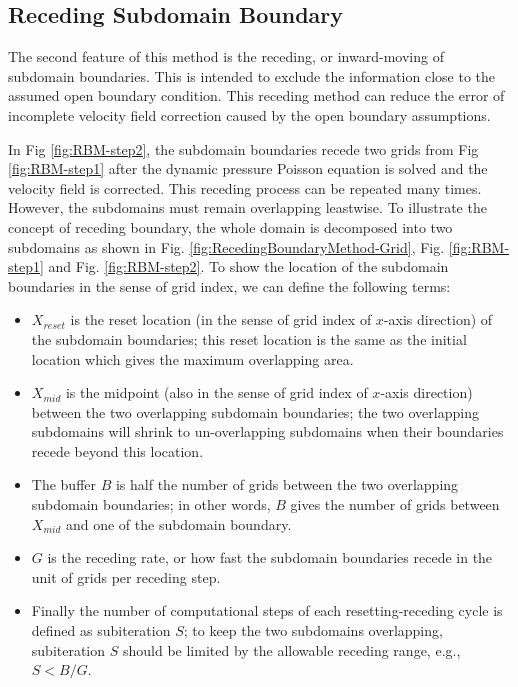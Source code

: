 \subsection{Receding Subdomain Boundary}

The second feature of this method is the receding, or inward-moving of subdomain boundaries. This is intended to exclude the information close to the assumed open boundary condition. This receding method can reduce the error of incomplete velocity field correction caused by the open boundary assumptions.

In Fig \ref{fig:RBM-step2}, the subdomain boundaries recede two grids from Fig \ref{fig:RBM-step1} after the dynamic pressure Poisson equation is solved and the velocity field is corrected. This receding process can be repeated many times. However, the subdomains must remain overlapping leastwise. To illustrate the concept of receding boundary, the whole domain is decomposed into two subdomains as shown in Fig. \ref{fig:RecedingBoundaryMethod-Grid}, Fig. \ref{fig:RBM-step1} and Fig. \ref{fig:RBM-step2}. To show the location of the subdomain boundaries in the sense of grid index, we can define the following terms:

\begin{itemize}
\item $X_{reset}$ is the reset location (in the sense of grid index of $x$-axis direction) of the subdomain boundaries; this reset location is the same as the initial location which gives the maximum overlapping area.
\item $X_{mid}$ is the midpoint (also in the sense of grid index of $x$-axis direction) between the two overlapping subdomain boundaries; the two overlapping subdomains will shrink to un-overlapping subdomains when their boundaries recede beyond this location.
\item The buffer $B$ is half the number of grids between the two overlapping subdomain boundaries; in other words, $B$ gives the number of grids between $X_{mid}$ and one of the subdomain boundary.
\item $G$ is the receding rate, or how fast the subdomain boundaries recede in the unit of grids per receding step.
\item Finally the number of computational steps of each resetting-receding cycle is defined as subiteration $S$; to keep the two subdomains overlapping, subiteration $S$ should be limited by the allowable receding range, e.g., $S<B/G$.
\end{itemize}

